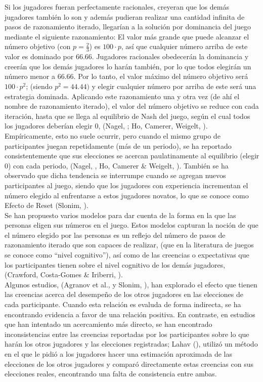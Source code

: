 Si los jugadores fueran perfectamente racionales, creyeran que los demás jugadores también lo son y además pudieran realizar una cantidad infinita de pasos de razonamiento iterado, llegarían a la solución por dominancia del juego mediante el siguiente razonamiento: El valor más grande que puede alcanzar el número objetivo (con $p = \frac{2}{3}$) es $100 \cdot p$, así que cualquier número arriba de este valor es dominado por $66.66$. Jugadores racionales obedecerán la dominancia y creerán que los demás jugadores lo harán también, por lo que todos elegirán un número menor a $66.66$. Por lo tanto, el valor máximo del número objetivo será $100 \cdot p^2$; (siendo $p^2=44.44)$ y elegir cualquier número por arriba de este será una estrategia dominada. Aplicando este razonamiento una y otra vez (de ahí el nombre de razonamiento iterado), el valor del número objetivo se reduce con cada iteración, hasta que se llega al equilibrio de Nash del juego, según el cual todos los jugadores deberían elegir $0$, (Nagel, \citeyear{Nagel}; Ho, Camerer, Weigelt, \citeyear{Ho}).\\

Empíricamente, esto no suele ocurrir, pero cuando el mismo grupo de participantes juegan repetidamente (más de un periodo), se ha reportado consistentemente que sus elecciones se acercan paulatinamente al equilibrio (elegir $0$) con cada periodo, (Nagel, \citeyear{Nagel}, Ho, Camerer & Weigelt, \citeyear{Ho}). También se ha observado que dicha tendencia se interrumpe cuando se agregan nuevos participantes al juego, siendo que los jugadores con experiencia incrementan el número elegido al enfrentarse a estos jugadores novatos, lo que se conoce como Efecto de Reset (Slonim, \citeyear{Slonim}).\\

Se han propuesto varios modelos para dar cuenta de la forma en la que las personas eligen sus números en el juego. Estos modelos capturan la noción de que el número elegido por las personas es un reflejo del número de pasos de razonamiento iterado que son capaces de realizar, (que en la literatura de juegos se conoce como “nivel cognitivo”), así como de las creencias o expectativas que los participantes tienen sobre el nivel cognitivo de los demás jugadores, (Crawford, Costa-Gomes & Iriberri, \citeyear{Crawford}).\\

Algunos estudios, (Agranov et al., \citeyear{Agranov} y Slonim, \citeyear{Slonim}),  han explorado el efecto que tienen las creencias acerca del desempeño de los otros jugadores en las elecciones de cada participante. Cuando esta relación es evaluda de forma indirecta, se ha encontrando evidencia a favor de una relación positiva. En contraste, en estudios que han intentado un acercamiento más directo, se han encontrado inconsistencias entre las creencias reportadas por los participantes sobre lo que harán los otros jugadores y las elecciones registradas; Lahav (\citeyear{Lahav}), utilizó un método en el que le pidió a los jugadores hacer una estimación aproximada de las elecciones de los otros jugadores y comparó directamente estas creencias con sus elecciones reales, encontrando una falta de consistencia entre ambas.\\


